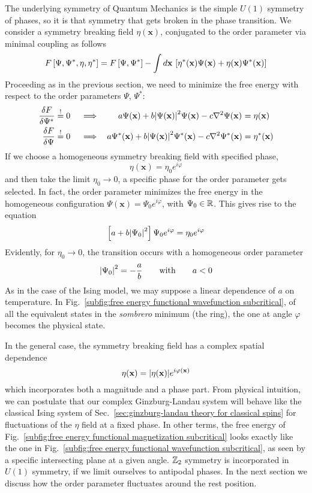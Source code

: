 The underlying symmetry of Quantum Mechanics is the simple $U(1)$ symmetry of phases, so it is that symmetry that gets broken in the phase transition. We consider a symmetry breaking field $\eta(\mathbf{x})$, conjugated to the order parameter via minimal coupling as follows
\[
    F\left[{\Psi,\Psi^*,\eta,\eta^*}\right] = F\left[{\Psi,\Psi^*}\right] - \int d\mathbf{x} \, \left[{ \eta^*(\mathbf{x}) \Psi(\mathbf{x}) + \eta(\mathbf{x}) \Psi^*(\mathbf{x}) }\right]
\]
Proceeding as in the previous section, we need to minimize the free energy with respect to the order parameters $\Psi$, $\Psi^*$:
\begin{align}
    \fdv{F}{\Psi^*} &\imp 0 &&\implies\hspace{2em}
    a \Psi(\mathbf{x}) + b \abs{\Psi(\mathbf{x})}^2 \Psi(\mathbf{x}) - c \laplacian \Psi(\mathbf{x}) \nquad&&= \eta(\mathbf{x}) \label{eq:free energy extremization ginzburg landau 1} \\
    \fdv{F}{\Psi} &\imp 0 &&\implies\hspace{0.67em}
    a \Psi^* (\mathbf{x}) + b \abs{\Psi(\mathbf{x})}^2 \Psi^* (\mathbf{x}) - c \laplacian \Psi^* (\mathbf{x}) \nquad&&= \eta^* (\mathbf{x}) \label{eq:free energy extremization ginzburg landau 2}
\end{align}
If we choose a homogeneous symmetry breaking field with specified phase,
\[
    \eta (\mathbf{x}) = \eta_0 e^{i\varphi}
\]
and then take the limit $\eta_0 \to 0$, a specific phase for the order parameter gets selected. In fact, the order parameter minimizes the free energy in the homogeneous configuration $\Psi(\mathbf{x}) = \Psi_0 e^{i\varphi}$, with $\Psi_0 \in \mathbb{R}$. This gives rise to the equation
\[
    \left[{ a + b \abs{\Psi_0}^2 }\right] \Psi_0 e^{i\varphi} = \eta_0 e^{i\varphi}
\]
Evidently, for $\eta_0 \to 0$, the transition occurs with a homogeneous order parameter
\[
    \abs{\Psi_0}^2 = - \frac{a}{b}
    \qquad\text{with}\qquad
    a < 0
\]
As in the case of the Ising model, we may suppose a linear dependence of $a$ on temperature. In Fig.~\ref{subfig:free energy functional wavefunction subcritical}, of all the equivalent states in the \textit{sombrero} minimum (the ring), the one at angle $\varphi$ becomes the physical state. 

In the general case, the symmetry breaking field has a complex spatial dependence
\[
    \eta (\mathbf{x}) = \abs{ \eta (\mathbf{x}) } e^{i \varphi(\mathbf{x})}
\]
which incorporates both a magnitude and a phase part. From physical intuition, we can postulate that our complex Ginzburg-Landau system will behave like the classical Ising system of Sec.~\ref{sec:ginzburg-landau theory for classical spins} for fluctuations of the $\eta$ field at a fixed phase. In other terms, the free energy of Fig.~\ref{subfig:free energy functional magnetization subcritical} looks exactly like the one in Fig.~\ref{subfig:free energy functional wavefunction subcritical}, as seen by a specific intersecting plane at a given angle. $\mathbb{Z}_2$ symmetry is incorporated in $U(1)$ symmetry, if we limit ourselves to antipodal phases. In the next section we discuss how the order parameter fluctuates around the rest position.

